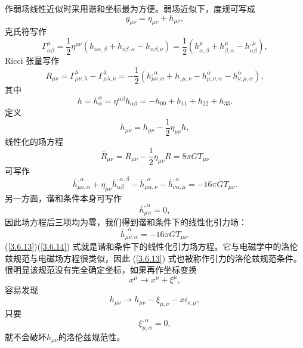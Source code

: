 \documentclass[11pt, a4paper, oneside, onecolumn]{ctexart}
\numberwithin{equation}{subsection}
\begin{document}
作弱场线性近似时采用谐和坐标最为方便。弱场近似下，度规可写成
\begin{equation}
g_{\mu\nu}=\eta_{\mu\nu}+h_{\mu\nu},
\end{equation}
克氏符写作
\begin{equation}
\Gamma_{\alpha\beta}^{\mu}=\frac12\eta^{\mu\nu}\left(h_{\nu\alpha,\beta}+h_{\nu\beta,\alpha}-h_{\alpha\beta,\nu}\right)=\frac12\left(h_{\alpha,\beta}^{\mu}+h_{\beta,\alpha}^{\mu}-h_{\alpha\beta}^{,\mu}\right),
\end{equation}
Ricci 张量写作
\begin{equation}
R_{\mu\nu}=\Gamma_{\mu\nu,\lambda}^{\lambda}-\Gamma_{\mu\lambda,\nu}^{\lambda}=-\frac{1}{2}\left(h_{\mu\nu,\alpha}^{,\alpha}+h_{,\mu,\nu}-h_{\mu,\nu,\alpha}^{\alpha}-h_{\nu,\mu,\alpha}^{\alpha}\right),
\end{equation}
其中
\begin{equation}
h=h^{\alpha}_{\alpha}=\eta^{\alpha\beta}h_{\alpha\beta}=-h_{00}+h_{11}+h_{22}+h_{33}.
\end{equation}
定义
\begin{equation}
\overline{h}_{\mu\nu}=h_{\mu\nu}-\frac12\eta_{\mu\nu}h,
\end{equation}
线性化的场方程
\begin{equation}
\overline{R}_{\mu\nu}=R_{\mu\nu}-\frac{1}{2}\eta_{\mu\nu}R=8\pi GT_{\mu\nu}
\end{equation}
可写作
\begin{equation}
\overline{h}_{\mu\nu,\alpha}^{,\alpha}+\eta_{\mu\nu}\overline{h}_{\alpha\beta}^{,\alpha,\beta}-\overline{h}_{\mu\alpha,\nu}^{,\alpha}-\overline{h}_{\nu\alpha,\mu}^{,\alpha}=-16\pi GT_{\mu\nu}.
\end{equation}
另一方面，谐和条件本身可写作
\begin{equation}
\overline{h}_{\mu\alpha}^{,\alpha}=0,\label{3.6.13}
\end{equation}
因此场方程后三项均为零，我们得到谐和条件下的线性化引力场：
\begin{equation}
\overline{h}_{\mu\nu,\alpha}^{,\alpha}=-16\pi GT_{\mu\nu}.\label{3.6.14}
\end{equation}
(\ref{3.6.13})(\ref{3.6.14}) 式就是谐和条件下的线性化引力场方程。它与电磁学中的洛伦兹规范与电磁场方程很类似，因此 (\ref{3.6.13}) 式也被称作引力的洛伦兹规范条件。很明显该规范没有完全确定坐标，如果再作坐标变换
\begin{equation}
x^{\mu}\to x^{\mu}+\xi^{\mu},
\end{equation}
容易发现
\begin{equation}
h_{\mu\nu}\to h_{\mu\nu}-\xi_{\mu,\nu}-xi_{\nu,\mu},
\end{equation}
只要
\begin{equation}
\xi^{,\alpha}_{\mu,\alpha}=0,\label{3.6.17}
\end{equation}
就不会破坏$h_{\mu\nu}$的洛伦兹规范性。
\end{document}
